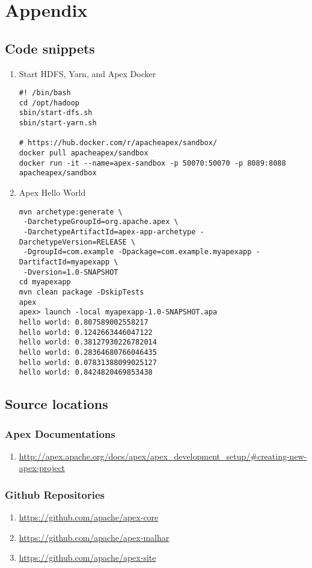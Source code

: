 \documentclass[11 pt]{IEEEtran}
\begin{document}
\newpage
\section{Appendix}
 
\subsection{Code snippets}
\begin{enumerate}
\item Start HDFS, Yarn, and Apex Docker
\begin{lstlisting}
#! /bin/bash
cd /opt/hadoop
sbin/start-dfs.sh
sbin/start-yarn.sh

# https://hub.docker.com/r/apacheapex/sandbox/
docker pull apacheapex/sandbox
docker run -it --name=apex-sandbox -p 50070:50070 -p 8089:8088 apacheapex/sandbox
\end{lstlisting}

 \item Apex Hello World
\begin{lstlisting}
mvn archetype:generate \
 -DarchetypeGroupId=org.apache.apex \
 -DarchetypeArtifactId=apex-app-archetype -DarchetypeVersion=RELEASE \
 -DgroupId=com.example -Dpackage=com.example.myapexapp -DartifactId=myapexapp \
 -Dversion=1.0-SNAPSHOT
cd myapexapp
mvn clean package -DskipTests
apex
apex> launch -local myapexapp-1.0-SNAPSHOT.apa 
hello world: 0.807589002558217
hello world: 0.1242663446047122
hello world: 0.38127930226782014
hello world: 0.28364680766046435
hello world: 0.07831388099025127
hello world: 0.8424820469853438
\end{lstlisting}
 \end{enumerate}


 \subsection{Source locations}
 
 \subsubsection{Apex Documentations}
 \begin{enumerate}
 \item[] \url{http://apex.apache.org/docs/apex/apex_development_setup/#creating-new-apex-project}
 \end{enumerate}

 \subsubsection{Github Repositories}
 \begin{enumerate}
	\item[] \url{https://github.com/apache/apex-core}
	\item[] \url{https://github.com/apache/apex-malhar}
	\item[] \url{https://github.com/apache/apex-site}
 \end{enumerate}
\end{document}
